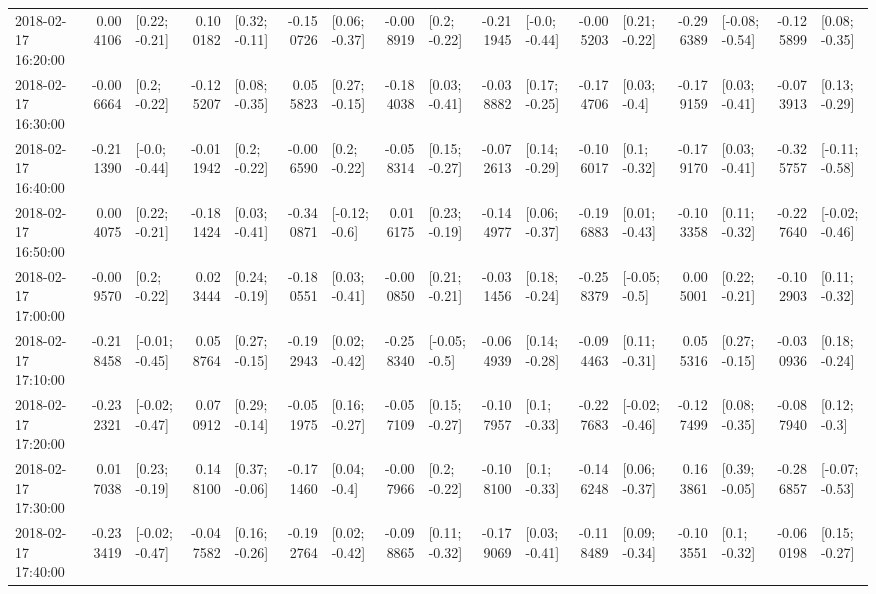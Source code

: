 \begin{tabular}{lrlrlrlrlrlrlrlrl}
2018-02-17 16:20:00 &  0.004106 &   [0.22; -0.21] &  0.100182 &   [0.32; -0.11] & -0.150726 &   [0.06; -0.37] & -0.008919 &    [0.2; -0.22] & -0.211945 &   [-0.0; -0.44] & -0.005203 &   [0.21; -0.22] & -0.296389 &  [-0.08; -0.54] & -0.125899 &   [0.08; -0.35] \\
2018-02-17 16:30:00 & -0.006664 &    [0.2; -0.22] & -0.125207 &   [0.08; -0.35] &  0.055823 &   [0.27; -0.15] & -0.184038 &   [0.03; -0.41] & -0.038882 &   [0.17; -0.25] & -0.174706 &    [0.03; -0.4] & -0.179159 &   [0.03; -0.41] & -0.073913 &   [0.13; -0.29] \\
2018-02-17 16:40:00 & -0.211390 &   [-0.0; -0.44] & -0.011942 &    [0.2; -0.22] & -0.006590 &    [0.2; -0.22] & -0.058314 &   [0.15; -0.27] & -0.072613 &   [0.14; -0.29] & -0.106017 &    [0.1; -0.32] & -0.179170 &   [0.03; -0.41] & -0.325757 &  [-0.11; -0.58] \\
2018-02-17 16:50:00 &  0.004075 &   [0.22; -0.21] & -0.181424 &   [0.03; -0.41] & -0.340871 &   [-0.12; -0.6] &  0.016175 &   [0.23; -0.19] & -0.144977 &   [0.06; -0.37] & -0.196883 &   [0.01; -0.43] & -0.103358 &   [0.11; -0.32] & -0.227640 &  [-0.02; -0.46] \\
2018-02-17 17:00:00 & -0.009570 &    [0.2; -0.22] &  0.023444 &   [0.24; -0.19] & -0.180551 &   [0.03; -0.41] & -0.000850 &   [0.21; -0.21] & -0.031456 &   [0.18; -0.24] & -0.258379 &   [-0.05; -0.5] &  0.005001 &   [0.22; -0.21] & -0.102903 &   [0.11; -0.32] \\
2018-02-17 17:10:00 & -0.218458 &  [-0.01; -0.45] &  0.058764 &   [0.27; -0.15] & -0.192943 &   [0.02; -0.42] & -0.258340 &   [-0.05; -0.5] & -0.064939 &   [0.14; -0.28] & -0.094463 &   [0.11; -0.31] &  0.055316 &   [0.27; -0.15] & -0.030936 &   [0.18; -0.24] \\
2018-02-17 17:20:00 & -0.232321 &  [-0.02; -0.47] &  0.070912 &   [0.29; -0.14] & -0.051975 &   [0.16; -0.27] & -0.057109 &   [0.15; -0.27] & -0.107957 &    [0.1; -0.33] & -0.227683 &  [-0.02; -0.46] & -0.127499 &   [0.08; -0.35] & -0.087940 &    [0.12; -0.3] \\
2018-02-17 17:30:00 &  0.017038 &   [0.23; -0.19] &  0.148100 &   [0.37; -0.06] & -0.171460 &    [0.04; -0.4] & -0.007966 &    [0.2; -0.22] & -0.108100 &    [0.1; -0.33] & -0.146248 &   [0.06; -0.37] &  0.163861 &   [0.39; -0.05] & -0.286857 &  [-0.07; -0.53] \\
2018-02-17 17:40:00 & -0.233419 &  [-0.02; -0.47] & -0.047582 &   [0.16; -0.26] & -0.192764 &   [0.02; -0.42] & -0.098865 &   [0.11; -0.32] & -0.179069 &   [0.03; -0.41] & -0.118489 &   [0.09; -0.34] & -0.103551 &    [0.1; -0.32] & -0.060198 &   [0.15; -0.27] \\

\end{tabular}
